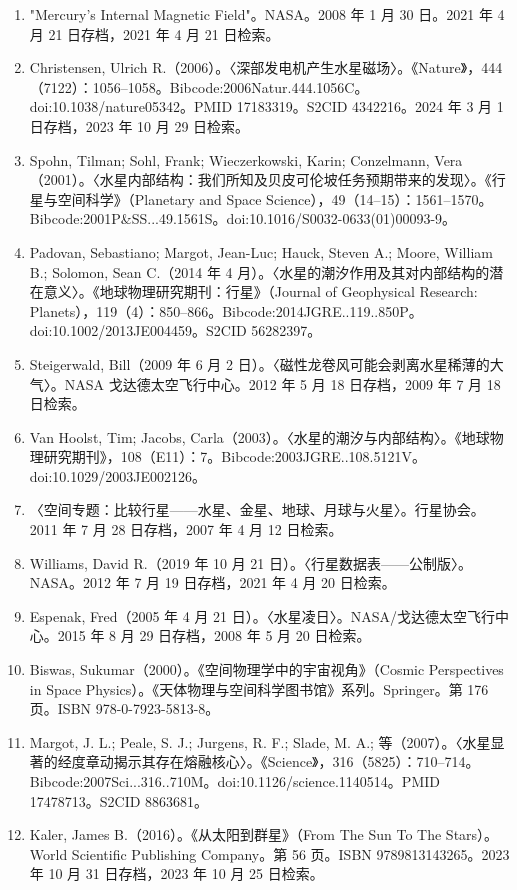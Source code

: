\begin{enumerate}
    \item "Mercury's Internal Magnetic Field"。NASA。2008 年 1 月 30 日。2021 年 4 月 21 日存档，2021 年 4 月 21 日检索。
    \item Christensen, Ulrich R.（2006）。〈深部发电机产生水星磁场〉。《Nature》，444（7122）：1056–1058。Bibcode:2006Natur.444.1056C。doi:10.1038/nature05342。PMID 17183319。S2CID 4342216。2024 年 3 月 1 日存档，2023 年 10 月 29 日检索。
    \item Spohn, Tilman; Sohl, Frank; Wieczerkowski, Karin; Conzelmann, Vera（2001）。〈水星内部结构：我们所知及贝皮可伦坡任务预期带来的发现〉。《行星与空间科学》（Planetary and Space Science），49（14–15）：1561–1570。Bibcode:2001P&SS...49.1561S。doi:10.1016/S0032-0633(01)00093-9。
    \item Padovan, Sebastiano; Margot, Jean-Luc; Hauck, Steven A.; Moore, William B.; Solomon, Sean C.（2014 年 4 月）。〈水星的潮汐作用及其对内部结构的潜在意义〉。《地球物理研究期刊：行星》（Journal of Geophysical Research: Planets），119（4）：850–866。Bibcode:2014JGRE..119..850P。doi:10.1002/2013JE004459。S2CID 56282397。
    \item Steigerwald, Bill（2009 年 6 月 2 日）。〈磁性龙卷风可能会剥离水星稀薄的大气〉。NASA 戈达德太空飞行中心。2012 年 5 月 18 日存档，2009 年 7 月 18 日检索。
    \item Van Hoolst, Tim; Jacobs, Carla（2003）。〈水星的潮汐与内部结构〉。《地球物理研究期刊》，108（E11）：7。Bibcode:2003JGRE..108.5121V。doi:10.1029/2003JE002126。
    \item 〈空间专题：比较行星——水星、金星、地球、月球与火星〉。行星协会。2011 年 7 月 28 日存档，2007 年 4 月 12 日检索。
    \item Williams, David R.（2019 年 10 月 21 日）。〈行星数据表——公制版〉。NASA。2012 年 7 月 19 日存档，2021 年 4 月 20 日检索。
    \item Espenak, Fred（2005 年 4 月 21 日）。〈水星凌日〉。NASA/戈达德太空飞行中心。2015 年 8 月 29 日存档，2008 年 5 月 20 日检索。
    \item Biswas, Sukumar（2000）。《空间物理学中的宇宙视角》（Cosmic Perspectives in Space Physics）。《天体物理与空间科学图书馆》系列。Springer。第 176 页。ISBN 978-0-7923-5813-8。
    \item Margot, J. L.; Peale, S. J.; Jurgens, R. F.; Slade, M. A.; 等（2007）。〈水星显著的经度章动揭示其存在熔融核心〉。《Science》，316（5825）：710–714。Bibcode:2007Sci...316..710M。doi:10.1126/science.1140514。PMID 17478713。S2CID 8863681。
    \item Kaler, James B.（2016）。《从太阳到群星》（From The Sun To The Stars）。World Scientific Publishing Company。第 56 页。ISBN 9789813143265。2023 年 10 月 31 日存档，2023 年 10 月 25 日检索。

\end{enumerate}
